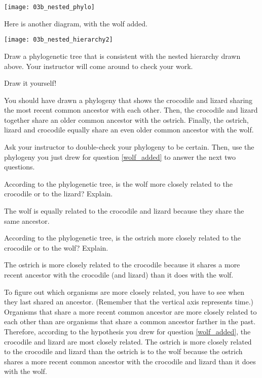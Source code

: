 \documentclass[12pt, hidelinks]{exam}
\newcommand*\AnswerBox[2]{%
    \parbox[t][#1]{0.92\textwidth}{%
    \begin{solution}#2\end{solution}}
}
\begin{document}
\begin{center}
	\noindent\texttt{[image: 03b\_nested\_phylo]}
\end{center}


Here is another diagram, with the wolf added.


\begin{center}
	\noindent\texttt{[image: 03b\_nested\_hierarchy2]}
\end{center}

\newpage

\begin{questions}
\setcounter{question}{4}

\question\label{wolf_added}
Draw a phylogenetic tree that is consistent with the nested
hierarchy drawn above. Your instructor will come around to check your work.

\AnswerBox{10\baselineskip}{Draw it yourself!}

\end{questions}

You should have drawn a phylogeny that shows the crocodile and lizard
sharing the most recent common ancestor with each other. Then, the
crocodile and lizard together share an older common ancestor with the
ostrich. Finally, the ostrich, lizard and crocodile equally share an
even older common ancestor with the wolf.

Ask your instructor to double-check your phylogeny to be certain. Then, use the
phylogeny you just drew for question \ref{wolf_added} to answer the next two
questions.

\begin{questions}
\setcounter{question}{5}

\question
According to the phylogenetic tree, is the wolf more closely
related to the crocodile or to the lizard? Explain.

\AnswerBox{4\baselineskip}{The wolf is equally related to the crocodile and
lizard because they share the same ancestor.}

\question
According to the phylogenetic tree, is the ostrich more
closely related to the crocodile or to the wolf? Explain.

\AnswerBox{4\baselineskip}{The ostrich is more closely related to the 
crocodile because it shares a more recent ancestor with the crocodile (and lizard)
than it does with the wolf.}

\end{questions}

To figure out which organisms are more closely related, you have to see
when they last shared an ancestor. (Remember that the vertical axis
represents time.) Organisms that share a more recent common ancestor are
more closely related to each other than are organisms that share a
common ancestor farther in the past. Therefore, according to the
hypothesis you drew for question \ref{wolf_added}, the crocodile and lizard are most
closely related. The ostrich is more closely related to the crocodile
and lizard than the ostrich is to the wolf because the ostrich shares a
more recent common ancestor with the crocodile and lizard than it does
with the wolf.
\end{document}
